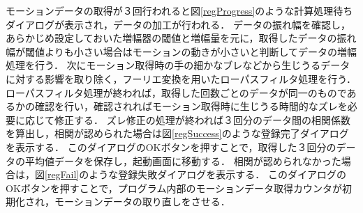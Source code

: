 \documentclass[11pt]{jreport}
\begin{document}
        モーションデータの取得が３回行われると図\ref{regProgress}のような計算処理待ちダイアログが表示され，データの加工が行われる．
        データの振れ幅を確認し，あらかじめ設定しておいた増幅器の閾値と増幅量を元に，取得したデータの振れ幅が閾値よりも小さい場合はモーションの動きが小さいと判断してデータの増幅処理を行う．
        次にモーション取得時の手の細かなブレなどから生じうるデータに対する影響を取り除く，フーリエ変換を用いたローパスフィルタ処理を行う．
        ローパスフィルタ処理が終われば，取得した回数ごとのデータが同一のものであるかの確認を行い，確認されればモーション取得時に生じうる時間的なズレを必要に応じて修正する．
        ズレ修正の処理が終われば３回分のデータ間の相関係数を算出し，相関が認められた場合は図\ref{regSuccess}のような登録完了ダイアログを表示する．
        このダイアログのOKボタンを押すことで，取得した３回分のデータの平均値データを保存し，起動画面に移動する．
        相関が認められなかった場合は，図\ref{regFail}のような登録失敗ダイアログを表示する．
        このダイアログのOKボタンを押すことで，プログラム内部のモーションデータ取得カウンタが初期化され，モーションデータの取り直しをさせる．
\end{document}
